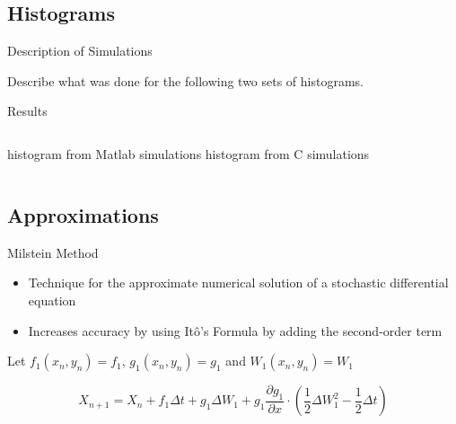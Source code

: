 
\subsection{Histograms}

\begin{frame}{Description of Simulations}

  Describe what was done for the following two sets of histograms.

\end{frame}


\begin{frame}{Results}
 

  \begin{columns}[t]
    histogram from Matlab simulations
    histogram from C simulations
  \end{columns}


\end{frame}



\subsection{Approximations}

\begin{frame}{Milstein Method}

	\begin{itemize}
		\item Technique for the approximate numerical solution of a stochastic differential equation
		\item Increases accuracy by using It\^o's Formula by adding the second-order term
	\end{itemize} 
	
	\vfill
	
Let $f_1(x_n,y_n) = f_1$, $g_1(x_n,y_n) = g_1$ and $W_1(x_n,y_n) = W_1$

		$$X_{n+1} = X_n + f_1\Delta t + g_1 \Delta W_1 + g_1 \frac{\partial g_1}{\partial x}  \cdot \left(\frac{1}{2} \Delta W_1 ^2 - \frac{1}{2} \Delta t \right)$$
	
	\vfill

\end{frame}

